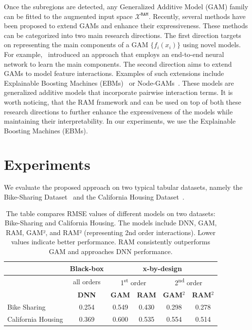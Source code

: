 \documentclass[runningheads]{llncs}
\begin{document}
Once the subregions are detected, any Generalized Additive Model (GAM) family can be fitted to the augmented input space $\mathcal{X}^{\mathtt{RAM}}$.
Recently, several methods have been proposed to extend GAMs and enhance their expressiveness.
These methods can be categorized into two main research directions.
The first direction targets on representing the main components of a GAM $\{ f_i(x_i) \}$ using novel models.
For example,~\citep{agarwal2021neural} introduced an approach that employs an end-to-end neural network to learn the main components.
The second direction aims to extend GAMs to model feature interactions.
Examples of such extensions include Explainable Boosting Machines (EBMs)~\citep{lou2013accurate} or
Node-GAMs~\citep{chang2021node}.
These models are generalized additive models that incorporate pairwise interaction terms.
It is worth noticing, that the RAM framework and can be used on top of both these research directions
to further enhance the expressiveness of the models while maintaining their interpretability.
In our experiments, we use the Explainable Boosting Machines (EBMs).


\section{Experiments}

We evaluate the proposed approach on two typical tabular datasets, namely the Bike-Sharing Dataset~\citep{misc_bike_sharing_dataset_275}
and the California Housing Dataset~\citep{pace1997sparse}.


\begin{table}[htbp]
  \centering
  \caption{The table compares RMSE values of different models on two datasets: Bike-Sharing and California Housing.
  The models include DNN, GAM, RAM, GAM², and RAM² (representing 2nd order interactions).
  Lower values indicate better performance.
  RAM consistently outperforms GAM and approaches DNN performance.}
  \label{tab:sample}
  \begin{tabular}{l|c|cccc}
      \hline
      & \textbf{Black-box} & \multicolumn{4}{c}{\textbf{x-by-design}} \\
      \hline
      \hline
      & all orders & \multicolumn{2}{c}{1\textsuperscript{st} order} & \multicolumn{2}{c}{2\textsuperscript{nd} order} \\
      \hline
      \hline
      & \textbf{DNN} & \textbf{GAM} & \textbf{RAM} & \textbf{GAM}$^2$ & \textbf{RAM}$^2$ \\
      \hline
      Bike Sharing      & 0.254 & 0.549 & 0.430 & 0.298 & 0.278 \\
      \hline
      California Housing      & 0.369 & 0.600 & 0.535 & 0.554 & 0.514 \\
  \end{tabular}
\end{table}
\end{document}
